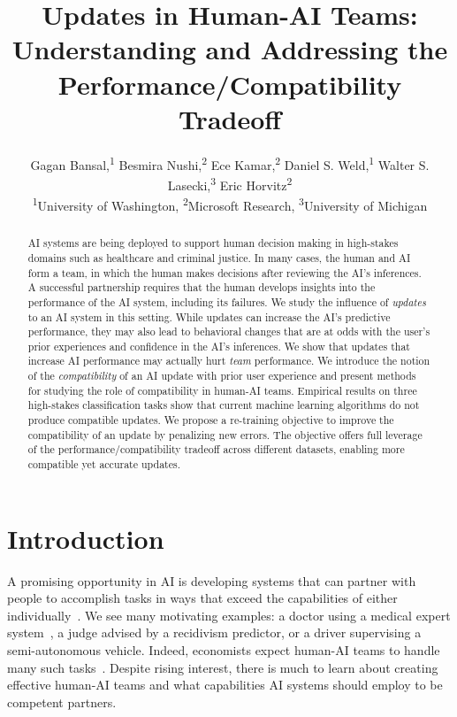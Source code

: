 \documentclass[letterpaper]{article}
\title{Updates in Human-AI Teams:\\ Understanding and Addressing the Performance/Compatibility Tradeoff}
\author{Gagan Bansal,\textsuperscript{\rm 1} Besmira Nushi,\textsuperscript{\rm 2} Ece Kamar,\textsuperscript{\rm 2} Daniel S. Weld,\textsuperscript{\rm 1} Walter S. Lasecki,\textsuperscript{\rm 3} Eric Horvitz\textsuperscript{\rm 2}\\
\textsuperscript{\rm 1}University of Washington,
\textsuperscript{\rm 2}Microsoft Research,
\textsuperscript{\rm 3}University of Michigan
}
\begin{document}
\maketitle
\begin{abstract}
AI systems are being deployed to support human decision making in high-stakes domains such as healthcare and criminal justice. In many cases, the human and AI form a team, in which the human makes decisions after reviewing the AI's inferences. A successful partnership requires that the human develops insights into the performance of the AI system, including its failures. We study the influence of {\em updates} to an AI system in this setting. While updates can increase the AI's predictive performance, they may also lead to behavioral changes that are at odds with the user's prior experiences and confidence in the AI's inferences. We show that updates that increase AI performance may actually hurt {\em team} performance. 
We introduce the notion of the {\em compatibility} of an AI update with prior user experience and present methods for studying the role of compatibility in human-AI teams. 
Empirical results on three high-stakes classification tasks show that current machine learning algorithms do not produce compatible updates. We propose a re-training objective to improve the compatibility of an update by penalizing new errors. The objective offers full leverage of the performance/compatibility tradeoff across different datasets, enabling more compatible yet accurate updates.
\end{abstract}

\section{Introduction}

A promising opportunity in AI is developing systems that can partner with people to accomplish tasks in ways that exceed the capabilities of either individually~\cite{wang2016deep,kamar2016directions,gaur2016effects}.
We see many motivating examples: a doctor using a medical expert system~\cite{wang2016deep}, a judge advised by a recidivism predictor, or a driver supervising a semi-autonomous vehicle. Indeed, economists expect human-AI teams to handle many such tasks~\cite{forrester-17}. Despite rising interest, there is much to learn about creating effective human-AI teams and what capabilities AI systems should employ to be competent partners. 
\end{document}
